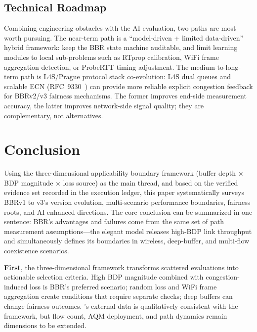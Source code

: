 \documentclass[a4paper,fleqn]{cas-sc}
\begin{document}
\subsection{Technical Roadmap}
\label{sec:ai_roadmap}

Combining engineering obstacles with the AI evaluation, two paths are most worth
pursuing. The near-term path is a ``model-driven + limited data-driven'' hybrid
framework: keep the BBR state machine auditable, and limit learning modules to
local sub-problems such as RTprop calibration, WiFi frame aggregation detection,
or ProbeRTT timing adjustment. The medium-to-long-term path is L4S/Prague
protocol stack co-evolution: L4S dual queues and scalable ECN
(RFC~9330~\citep{rfc9330}) can provide more reliable explicit congestion feedback
for BBRv2/v3 fairness mechanisms. The former improves end-side measurement
accuracy, the latter improves network-side signal quality; they are complementary,
not alternatives.

\section{Conclusion}
\label{sec:conclusion}

Using the three-dimensional applicability boundary framework (buffer depth
$\times$ BDP magnitude $\times$ loss source) as the main thread, and based on
the verified evidence set recorded in the execution ledger,
this paper systematically surveys BBRv1 to v3's version evolution, multi-scenario
performance boundaries, fairness roots, and AI-enhanced directions. The core
conclusion can be summarized in one sentence: BBR's advantages and failures come
from the same set of path measurement assumptions---the elegant model releases
high-BDP link throughput and simultaneously defines its boundaries in wireless,
deep-buffer, and multi-flow coexistence scenarios.

\textbf{First}, the three-dimensional framework transforms scattered evaluations
into actionable selection criteria. High BDP magnitude combined with
congestion-induced loss is BBR's preferred scenario; random loss and WiFi frame
aggregation create conditions that require separate checks; deep buffers can
change fairness outcomes.
\citet{scholz2018deeper}'s external data is qualitatively consistent with the
framework, but flow count, AQM deployment, and path dynamics remain dimensions to
be extended.
\end{document}
